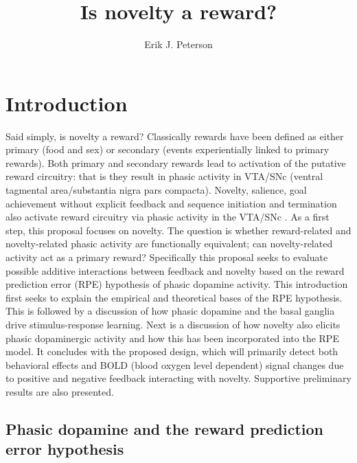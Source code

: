 \documentclass[doc]{apa}        %
\title{Is novelty a reward?}
\author{Erik J. Peterson} \affiliation{Dissertation Proposal\\ Fall 2010 \\ Dept. of Psychology \\ Colorado State University \\ Fort Collins, CO}
\begin{document}
 
\maketitle
\newpage

\section{Introduction} %
\label{sec:introduction}

Said simply, is novelty a reward?  Classically rewards have been defined as either primary (food and sex) or secondary (events experientially linked to primary rewards).  Both primary and secondary rewards lead to activation of the putative reward circuitry: that is they result in phasic activity in VTA/SNc (ventral tagmental area/substantia nigra pars compacta).  Novelty, salience, goal achievement without explicit feedback and sequence initiation and termination also activate reward circuitry via phasic activity in the VTA/SNc \cite{Wittmann:2008p541,Jin:2010p7199,Tricomi:2008p6663,Roesch:2010p7179,Zink:2003p5107}. As a first step, this proposal focuses on novelty. The question is whether reward-related and novelty-related phasic activity are functionally equivalent;  can novelty-related activity act as a primary reward?    Specifically this proposal seeks to evaluate possible additive interactions between feedback and novelty based on the reward prediction error (RPE) hypothesis of phasic dopamine activity.  This introduction first seeks to explain the empirical and theoretical bases of the RPE hypothesis.  This is followed by a discussion of how phasic dopamine and the basal ganglia drive stimulus-response learning.  Next is a discussion of how novelty also elicits phasic dopaminergic activity and how this has been incorporated into the RPE model. It concludes with the proposed design, which will primarily detect both behavioral effects and BOLD (blood oxygen level dependent) signal changes due to positive and negative feedback interacting with novelty.  Supportive preliminary results are also presented.

\subsection{Phasic dopamine and the reward prediction error hypothesis} %
\label{sub:phasic_dopamine_and_the_reward_prediction_error_hypothesis}
\end{document}
